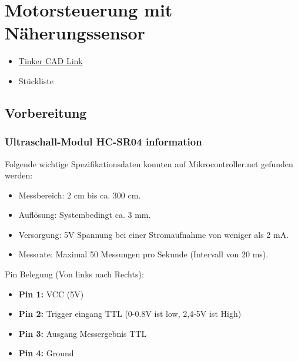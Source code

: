 
\newpage
\section{Motorsteuerung mit Näherungssensor}

\begin{itemize}
    \item \href{https://www.tinkercad.com/things/hbu5BrjimWH-motorsteuerung-mit-naherungssensor?sharecode=gi4HZSHWYtQ_-pqyN-BGPv7sjuL0sj8BF5-5UPD97Eg}{Tinker CAD Link}
    \item Stückliste
\end{itemize} 

\subsection{Vorbereitung} 

\subsubsection{Ultraschall-Modul HC-SR04 information} 
Folgende wichtige Spezifikationsdaten konnten auf Mikrocontroller.net gefunden werden:

\begin{itemize}
    \item Messbereich: 2 cm bis ca. 300 cm.
    \item Auflösung: Systembedingt ca. 3 mm.
    \item Versorgung: 5V Spannung bei einer Stromaufnahme von weniger als 2 mA.
    \item Messrate: Maximal 50 Messungen pro Sekunde (Intervall von 20 ms).
\end{itemize}

Pin Belegung (Von links nach Rechts):

\begin{itemize}
    \item \textbf{Pin 1: } VCC (5V)
    \item \textbf{Pin 2: } Trigger eingang TTL (0-0.8V ist low, 2,4-5V ist High)
    \item \textbf{Pin 3: } Ausgang Messergebnis TTL
    \item \textbf{Pin 4: } Ground
\end{itemize}

